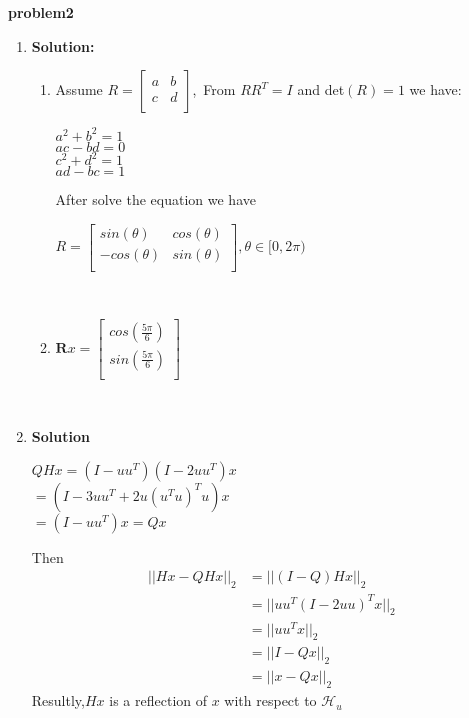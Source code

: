 \documentclass[english,onecolumn,UTF8]{IEEEtran}
\begin{document}
\textbf{problem2}
\begin{enumerate}
	\item \textbf{Solution:}\\
	\begin{enumerate}
		\item 
		Assume $R=
		\begin{bmatrix}
		a & b \\
		c & d \\
		\end{bmatrix}
		$,\ 
		From $RR^{T}=I$ and det$(R)=1$ we have:
		\begin{center}
		$ a^{2}+b^{2}=1$\\
		$ac-bd=0$\\
		$c^{2}+d^{2}=1$\\
		$ad-bc=1$\\			
		\end{center}
	After solve the equation we have\\
		\begin{center}
		$R=\begin{bmatrix}
		sin(\theta) & cos(\theta)\\
		-cos(\theta) & sin(\theta)\\
		\end{bmatrix}
		,\theta \in [0,2\pi)
		$		
		\end{center}
~\\	
\item
		
			$\textbf{R}x=\begin{bmatrix}
				cos(\frac{5\pi}{6})\\
				sin(\frac{5\pi}{6})\\
			 \end{bmatrix}
			$
	
	\end{enumerate}
	~\\
	\item\textbf{Solution}
	\begin{center}
		$QHx
		=(I-uu^{T})(I-2uu^{T})x$\\
		\qquad\qquad$=(I-3uu^{T}+2u(u^{T}u)^{T}u)x
		$\\
		$=(I-uu^{T})x=Qx$
		\end{center}
	Then
	\begin{align*}
	||Hx-QHx||_{2}
	&=||(I-Q)Hx||_{2}\\
	&=||uu^{T}(I-2uu)^{T}x||_{2}\\
	&=||uu^{T}x||_{2}\\
	&=||I-Qx||_{2}\\
	&=||x-Qx||_{2}
	\end{align*}
	Resultly,$Hx$ is a reflection of $x$ with respect to $\mathcal{H}_{u}$
	
\end{enumerate}
\end{document}
